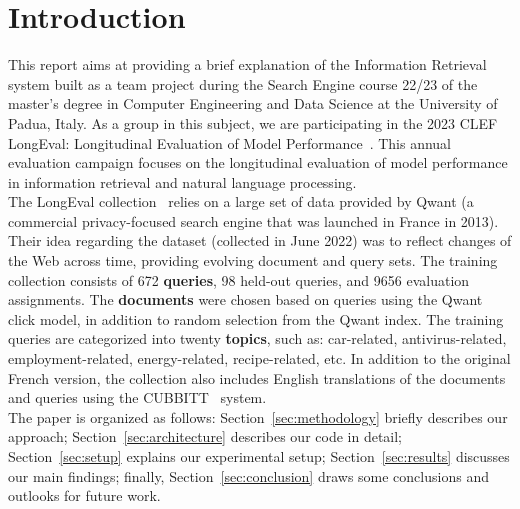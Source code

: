 \section{Introduction}\label{sec:introduction}
This report aims at providing a brief explanation of the Information Retrieval system built as a team project during the
Search Engine course 22/23 of the master's degree in Computer Engineering and Data Science at the University of Padua,
Italy.
As a group in this subject, we are participating in the 2023 CLEF LongEval: Longitudinal Evaluation of Model
Performance~\cite{LongEval}.
This annual evaluation campaign focuses on the longitudinal evaluation of model performance in information retrieval and
natural language processing.\\

The LongEval collection~\cite{traindata} relies on a large set of data provided by Qwant (a commercial privacy-focused
search engine that was launched in France in 2013).
Their idea regarding the dataset (collected in June 2022) was to reflect changes of the Web across time, providing
evolving document and query sets.
The training collection consists of 672 \textbf{queries}, 98 held-out queries, and 9656 evaluation assignments.
The \textbf{documents} were chosen based on queries using the Qwant click model, in addition to random selection from
the Qwant index.
The training queries are categorized into twenty \textbf{topics}, such as: car-related, antivirus-related,
employment-related, energy-related, recipe-related, etc.
In addition to the original French version, the collection also includes English translations of the documents and
queries using the CUBBITT~\cite{CUBBITT} system.\\

The paper is organized as follows:
Section~\ref{sec:methodology} briefly describes our approach;
Section~\ref{sec:architecture} describes our code in detail;
Section~\ref{sec:setup} explains our experimental setup;
Section~\ref{sec:results} discusses our main findings; finally,
Section~\ref{sec:conclusion} draws some conclusions and outlooks for future work.